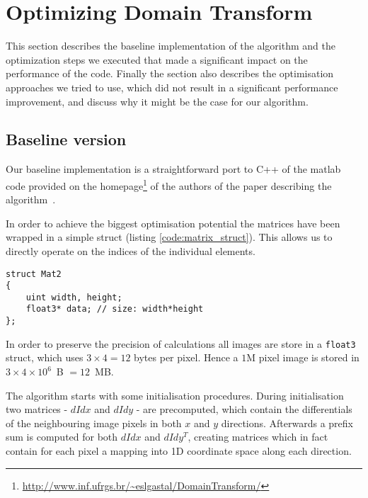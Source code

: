 \section{Optimizing Domain Transform}

This section describes the baseline implementation of the algorithm and the optimization steps we executed that made a significant impact on the performance of the code. Finally the section also describes the optimisation approaches we tried to use, which did not result in a significant performance improvement, and discuss why it might be the case for our algorithm.

\subsection{Baseline version}

Our baseline implementation is a straightforward port to C++ of the matlab code provided on the homepage\footnote{\url{http://www.inf.ufrgs.br/~eslgastal/DomainTransform/}} of the authors of the paper describing the algorithm~\cite{GastalOliveira2011DomainTransform}.

In order to achieve the biggest optimisation potential the matrices have been wrapped in a simple struct (listing \ref{code:matrix_struct}). This allows us to directly operate on the indices of the individual elements.

\begin{lstlisting}[caption=Matrix struct,label=code:matrix_struct]
struct Mat2
{
    uint width, height;
    float3* data; // size: width*height
};
\end{lstlisting}

In order to preserve the precision of calculations all images are store in a \lstinline{float3} struct, which uses $3\times 4 = 12$ bytes per pixel. Hence a $1$M pixel image is stored in $3\times 4\times 10^6$\ B $=12$\ MB.

The algorithm starts with some initialisation procedures. During initialisation two matrices - $dIdx$ and $dIdy$ - are precomputed, which contain the differentials of the neighbouring image pixels in both $x$ and $y$ directions. Afterwards a prefix sum is computed for both $dIdx$ and $dIdy^T$, creating matrices which in fact contain for each pixel a mapping into 1D coordinate space along each direction.

